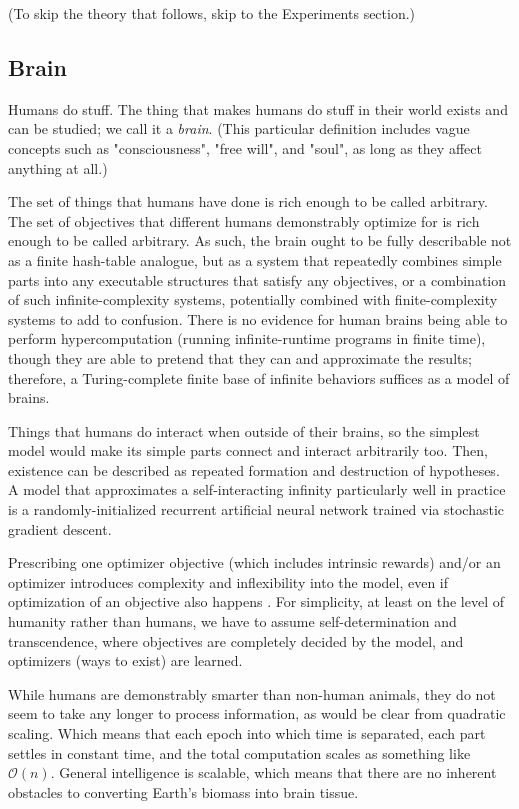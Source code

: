 \documentclass{article}
\begin{document}
(To skip the theory that follows, skip to the Experiments section.)

\subsection{Brain}

Humans do stuff. The thing that makes humans do stuff in their world exists and can be studied; we call it a \textit{brain}. (This particular definition includes vague concepts such as "consciousness", "free will", and "soul", as long as they affect anything at all.)

The set of things that humans have done is rich enough to be called arbitrary. The set of objectives that different humans demonstrably optimize for is rich enough to be called arbitrary. As such, the brain ought to be fully describable not as a finite hash-table analogue, but as a system that repeatedly combines simple parts into any executable structures that satisfy any objectives, or a combination of such infinite-complexity systems, potentially combined with finite-complexity systems to add to confusion. There is no evidence for human brains being able to perform hypercomputation (running infinite-runtime programs in finite time), though they are able to pretend that they can and approximate the results; therefore, a Turing-complete finite base of infinite behaviors suffices as a model of brains.

Things that humans do interact when outside of their brains, so the simplest model would make its simple parts connect and interact arbitrarily too. Then, existence can be described as repeated formation and destruction of hypotheses. A model that approximates a self-interacting infinity particularly well in practice is a randomly-initialized recurrent artificial neural network trained via stochastic gradient descent.

Prescribing one optimizer objective (which includes intrinsic rewards) and/or an optimizer introduces complexity and inflexibility into the model, even if optimization of an objective also happens \cite{Dabney2020}. For simplicity, at least on the level of humanity rather than humans, we have to assume self-determination and transcendence, where objectives are completely decided by the model, and optimizers (ways to exist) are learned.

While humans are demonstrably smarter than non-human animals, they do not seem to take any longer to process information, as would be clear from quadratic scaling. Which means that each epoch into which time is separated, each part settles in constant time, and the total computation scales as something like $\mathcal{O}(n)$. General intelligence is scalable, which means that there are no inherent obstacles to converting Earth's biomass into brain tissue.
\end{document}
